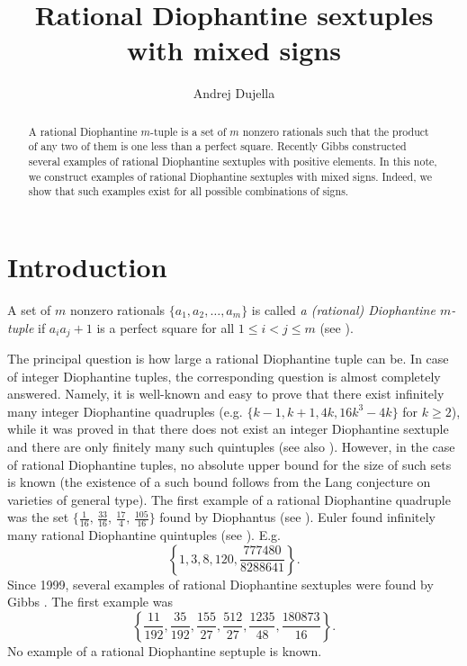 \documentclass [11pt] {article}
\begin{document}
\title{{\Large{\bf Rational Diophantine sextuples with mixed signs}}}

\author{Andrej Dujella}


\date{}
\maketitle


\begin{abstract}
A rational Diophantine $m$-tuple is a set of $m$ nonzero rationals
such that the product of any two of them is one less than a perfect
square. Recently Gibbs constructed several examples of rational
Diophantine sextuples with positive elements. In this note, we
construct examples of rational Diophantine sextuples with mixed
signs. Indeed, we show that such examples exist for all possible
combinations of signs.
\end{abstract}


\section{Introduction}
A set of $m$ nonzero rationals $\{a_1,a_2,\ldots,a_m\}$ is called
{\em a (rational) Diophantine $m$-tuple} if $a_ia_j+1$ is a
perfect square for all $1\leq i<j\leq m$ (see \cite{D-acta2}).

The principal question is how large a rational Diophantine tuple can be.
In case of integer Diophantine tuples, the corresponding question
is almost completely answered. Namely, it is well-known and easy to prove that
there exist infinitely many integer Diophantine quadruples (e.g. $\{k-1,k+1,4k,16k^3-4k\}$
for $k\geq 2$), while it was proved
in \cite{D-crelle} that there does not exist an integer Diophantine sextuple
and there are only finitely many such quintuples (see also \cite{Fuj-reg}).
However, in the case of rational Diophantine tuples, no absolute upper
bound for the size of such sets is known (the existence of a such bound
follows from the Lang conjecture on varieties of general type).
The first example of a rational Diophantine quadruple was the set
$\{\frac{1}{16},\, \frac{33}{16},\, \frac{17}{4},\, \frac{105}{16}\}$
found by Diophantus (see \cite{Dio}).
Euler found infinitely many rational Diophantine quintuples (see \cite{Hea}). E.g.
$$ \left\{ 1, 3, 8, 120, \frac{777480}{8288641} \right\}. $$
Since 1999, several examples of rational Diophantine sextuples were found by Gibbs \cite{Gibbs1,Gibbs2}.
The first example was
$$ \left\{ \frac{11}{192}, \frac{35}{192}, \frac{155}{27}, \frac{512}{27}, \frac{1235}{48},
\frac{180873}{16} \right\} . $$
No example of a rational Diophantine septuple is known.
\end{document}
